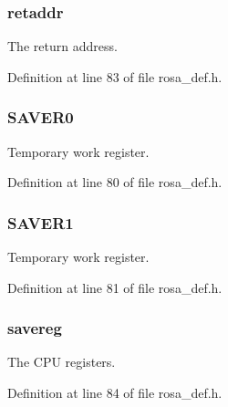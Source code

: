 \subsubsection[{retaddr}]{\setlength{\rightskip}{0pt plus 5cm}retaddr}\label{structtcb__record__t_a3a7c64427bddbb6ef8ac755f2782baf7}
The return address. 

Definition at line 83 of file rosa\+\_\+def.\+h.

\hypertarget{structtcb__record__t_a753e67212cb8cd447171d33a8e75c11e}{}
\subsubsection[{S\+A\+V\+E\+R0}]{\setlength{\rightskip}{0pt plus 5cm}S\+A\+V\+E\+R0}\label{structtcb__record__t_a753e67212cb8cd447171d33a8e75c11e}
Temporary work register. 

Definition at line 80 of file rosa\+\_\+def.\+h.

\hypertarget{structtcb__record__t_a1137e438d580c22c21044a334356b696}{}
\subsubsection[{S\+A\+V\+E\+R1}]{\setlength{\rightskip}{0pt plus 5cm}S\+A\+V\+E\+R1}\label{structtcb__record__t_a1137e438d580c22c21044a334356b696}
Temporary work register. 

Definition at line 81 of file rosa\+\_\+def.\+h.

\hypertarget{structtcb__record__t_a22aa27436be4418c5ad79657a2128b0e}{}
\subsubsection[{savereg}]{\setlength{\rightskip}{0pt plus 5cm}savereg}\label{structtcb__record__t_a22aa27436be4418c5ad79657a2128b0e}
The C\+P\+U registers. 

Definition at line 84 of file rosa\+\_\+def.\+h.

\hypertarget{structtcb__record__t_a4b57f27f8be80d5cedeb6e3a7a759d18}{}
